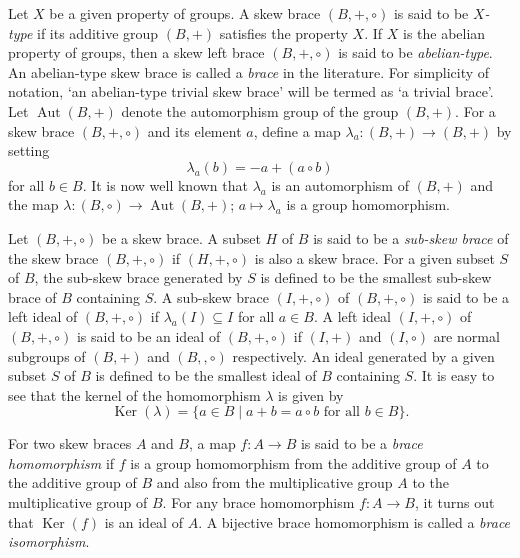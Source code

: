 \documentclass[oneside]{amsart}
\numberwithin{equation}{section}
\theoremstyle{plain}
\theoremstyle{definition}
\newcommand{\Aut}{\operatorname{Aut} }
\newcommand{\Ker}{\operatorname{Ker} }
\begin{document}
   Let $X$ be a given property of  groups.   A skew brace $(B, +, \circ)$ is said to be {\it $X$-type} if its additive group $(B,+)$ satisfies  the property $X$. If $X$ is the abelian property of groups, then a  skew left brace $(B, +, \circ)$ is said to be  \emph{abelian-type}.  An abelian-type skew  brace is called a \emph{brace} in the literature. For simplicity of notation, `an abelian-type trivial skew brace' will be termed as `a trivial brace'.
Let $\Aut(B, +)$ denote the automorphism group of the group $(B, +)$. For a skew brace  $(B, +, \circ)$ and its element  $a$, define a map $\lambda_a : (B, +) \to (B, +)$  by setting 
 $$\lambda_a(b) = - a + (a \circ b)$$ 
 for all $b \in B$. It is now well known that $\lambda_a$ is an automorphism of $(B, +)$ and the  map $\lambda : (B, \circ) \to \Aut(B, +)$; $a \mapsto \lambda_a$ is a group homomorphism. 
    

  Let $(B,  +, \circ)$ be a skew  brace. A subset $H$ of $B$ is said to be a {\it sub-skew  brace} of the skew   brace $(B, +, \circ)$  if $(H, + , \circ)$ is also a skew  brace.   For a given subset $S$ of $B$, the sub-skew brace generated by $S$ is defined to be the smallest sub-skew brace of $B$ containing $S$.  A sub-skew brace $(I, +, \circ)$ of  $(B, +, \circ)$  is said to be a left ideal of $(B, +, \circ)$ if $\lambda_a(I) \subseteq I$ for all  $a \in B$.  A left ideal $(I, +, \circ)$ of $(B, +, \circ)$ is said to be an ideal of $(B, +, \circ)$ if $(I, +)$ and $(I, \circ)$ are normal subgroups of $(B, +)$ and $(B,, \circ)$ respectively.   An ideal generated by a given subset $S$ of $B$ is defined to be the smallest ideal of $B$ containing $S$. It is easy to see that the  kernel of the homomorphism $\lambda$ is given by 
 $$\Ker(\lambda) = \{a \in B \mid a + b = a \circ b \mbox{ for all } b \in B \}.$$

    
    
For two skew braces $A$ and $B$, a map $f : A \to B$ is said to be a {\it brace homomorphism} if $f$ is a group homomorphism from the additive group of $A$ to the additive group of $B$ and also from the multiplicative group $A$ to the multiplicative group of $B$. For any brace homomorphism $f : A \to B$, it turns out that $\Ker(f)$ is an ideal of $A$. A bijective brace homomorphism is called a {\it brace isomorphism}. 
\end{document}
